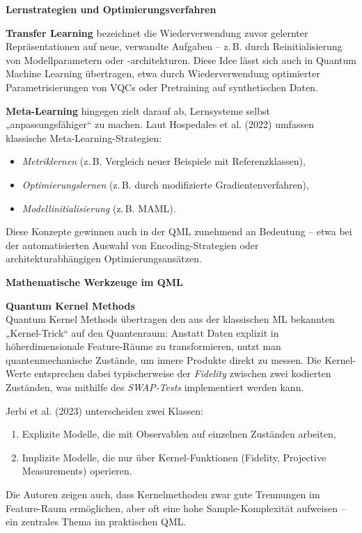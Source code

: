 \noindent\textbf{Lernstrategien und Optimierungsverfahren}  

\vspace{0.2cm}
\noindent
\textbf{Transfer Learning} bezeichnet die Wiederverwendung zuvor gelernter Repräsentationen auf neue, verwandte Aufgaben – z.\,B. durch Reinitialisierung von Modellparametern oder -architekturen. Diese Idee lässt sich auch in Quantum Machine Learning übertragen, etwa durch Wiederverwendung optimierter Parametrisierungen von VQCs oder Pretraining auf synthetischen Daten.

\vspace{0.2cm}
\noindent
\textbf{Meta-Learning} hingegen zielt darauf ab, Lernsysteme selbst „anpassungsfähiger“ zu machen. Laut Hospedales et al. (2022) umfassen klassische Meta-Learning-Strategien:
\begin{itemize}
  \item \textit{Metriklernen} (z.\,B. Vergleich neuer Beispiele mit Referenzklassen),
  \item \textit{Optimierungslernen} (z.\,B. durch modifizierte Gradientenverfahren),
  \item \textit{Modellinitialisierung} (z.\,B. MAML).
\end{itemize}
Diese Konzepte gewinnen auch in der QML zunehmend an Bedeutung – etwa bei der automatisierten Auswahl von Encoding-Strategien oder architekturabhängigen Optimierungsansätzen. \cite{hospedales2022} 

\vspace{0.7cm}
\noindent\textbf{Mathematische Werkzeuge im QML}  

\vspace{0.2cm}
\noindent
\textbf{Quantum Kernel Methods}\\
Quantum Kernel Methods übertragen den aus der klassischen ML bekannten „Kernel-Trick“ auf den Quantenraum: Anstatt Daten explizit in höherdimensionale Feature-Räume zu transformieren, nutzt man quantenmechanische Zustände, um innere Produkte direkt zu messen. Die Kernel-Werte entsprechen dabei typischerweise der \textit{Fidelity} zwischen zwei kodierten Zuständen, was mithilfe des \textit{SWAP-Tests} implementiert werden kann.  

Jerbi et al. (2023) unterscheiden zwei Klassen:
\begin{enumerate}
  \item Explizite Modelle, die mit Observablen auf einzelnen Zuständen arbeiten,
  \item Implizite Modelle, die nur über Kernel-Funktionen (Fidelity, Projective Measurements) operieren.
\end{enumerate}
Die Autoren zeigen auch, dass Kernelmethoden zwar gute Trennungen im Feature-Raum ermöglichen, aber oft eine hohe Sample-Komplexität aufweisen – ein zentrales Thema im praktischen QML.

